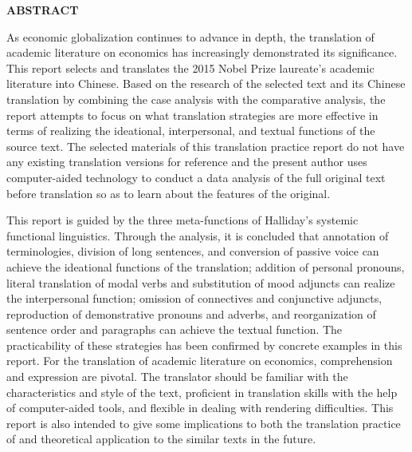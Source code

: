 
\vspace*{2em}

\begin{center}
	\textbf{ABSTRACT}
	\vspace{2mm}
	\ifx\subtitle\undefined\else
	\begin{spacing}{1.2}
		\sanhao\selectfont{\textmd{\kaishu{-----}\subtitle}}
	\end{spacing}
	\fi
\end{center}
\vspace{1em}

\setlength{\parskip}{0em}

As economic globalization continues to advance in depth, the translation of academic literature on economics has increasingly demonstrated its significance. This report selects and translates the 2015 Nobel Prize laureate’s academic literature into Chinese. Based on the research of the selected text and its Chinese translation by combining the case analysis with the comparative analysis, the report attempts to focus on what translation strategies are more effective in terms of realizing the ideational, interpersonal, and textual functions of the source text. The selected materials of this translation practice report do not have any existing translation versions for reference and the present author uses computer-aided technology to conduct a data analysis of the full original text before translation so as to learn about the features of the original.
\par
This report is guided by the three meta-functions of Halliday’s systemic functional linguistics. Through the analysis, it is concluded that annotation of terminologies, division of long sentences, and conversion of passive voice can achieve the ideational functions of the translation; addition of personal pronouns, literal translation of modal verbs and substitution of mood adjuncts can realize the interpersonal function; omission of connectives and conjunctive adjuncts, reproduction of demonstrative pronouns and adverbs, and reorganization of sentence order and paragraphs can achieve the textual function. The practicability of these strategies has been confirmed by concrete examples in this report. For the translation of academic literature on economics, comprehension and expression are pivotal. The translator should be familiar with the characteristics and style of the text, proficient in translation skills with the help of computer-aided tools, and flexible in dealing with rendering difficulties. This report is also intended to give some implications to both the translation practice of and theoretical application to the similar texts in the future.
\par

